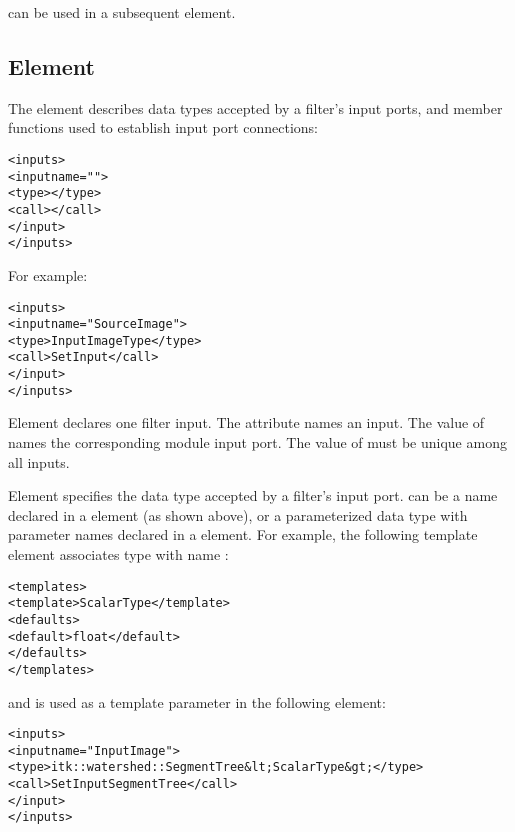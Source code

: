  can be used in a subsequent
 element.


\subsection{Element }
\label{sec:itk_mods:inputs_element}

The  element describes data types accepted by a
filter's input ports, and member functions used to
establish input port connections:

\begin{alltt}
  <inputs>
    <input name="">
      <type></type>
      <call></call>
    </input>
    \velide
  </inputs>
\end{alltt}

For example:

\begin{alltt}
  <inputs>
    <input name="SourceImage">
      <type>InputImageType</type>
      <call>SetInput</call>
    </input>
  </inputs>
\end{alltt}

Element  declares one filter input.
The  attribute names an input.  The value of
 names the corresponding \sr{} module input port.
The value of  must be unique among all inputs.

Element  specifies the data type accepted by a
filter's input port.   can be a name
declared in a  element (as shown above), or a
parameterized data type with  parameter names declared in a
 element. For example, the following template
element associates type  with name
:

\begin{alltt}
  <templates>
    <template>ScalarType</template>
    <defaults>
      <default>float</default>
    </defaults>
  </templates>
\end{alltt}

and  is used as a template parameter in the
following  element:

\begin{alltt}
  <inputs>
    <input name="InputImage">
      <type>itk::watershed::SegmentTree&lt;ScalarType&gt;</type>
      <call>SetInputSegmentTree</call>
    </input>
  </inputs>
\end{alltt}

